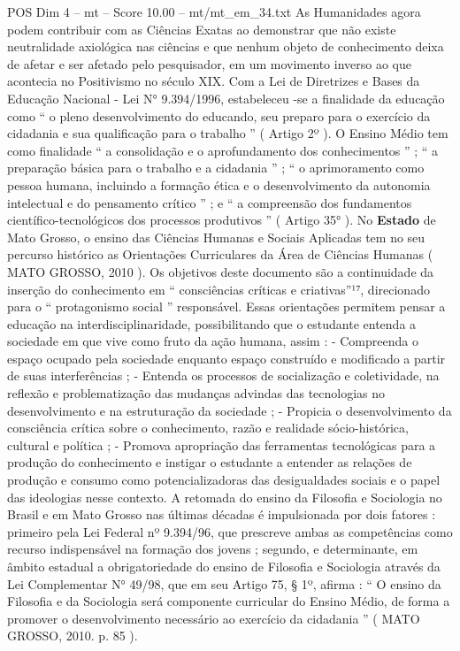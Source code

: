 \begin{textsample}{POS Dim 4 – mt – Score 10.00 – mt/mt\_em\_34.txt}
As Humanidades agora podem contribuir com as Ciências Exatas ao demonstrar que não existe neutralidade axiológica nas ciências e que nenhum objeto de conhecimento deixa de afetar e ser afetado pelo pesquisador, em um movimento inverso ao que acontecia no Positivismo no século XIX.
Com a Lei de Diretrizes e Bases da Educação Nacional - Lei N{\EmojiFont °} 9.394/1996, estabeleceu -se a finalidade da educação como “ o pleno desenvolvimento do educando, seu preparo para o exercício da cidadania e sua qualificação para o trabalho ” ( Artigo 2º ).
O Ensino Médio tem como finalidade “ a consolidação e o aprofundamento dos conhecimentos ” ; “ a preparação básica para o trabalho e a cidadania ” ; “ o aprimoramento como pessoa humana, incluindo a formação ética e o desenvolvimento da autonomia intelectual e do pensamento crítico ” ; e “ a compreensão dos fundamentos científico-tecnológicos dos processos produtivos ” ( Artigo 35{\EmojiFont °} ).
No \textbf{Estado} de Mato Grosso, o ensino das Ciências Humanas e Sociais Aplicadas tem no seu percurso histórico as Orientações Curriculares da Área de Ciências Humanas ( MATO GROSSO, 2010 ).
Os objetivos deste documento são a continuidade da inserção do conhecimento em “ consciências críticas e criativas”¹⁷, direcionado para o “ protagonismo social ” responsável.
Essas orientações permitem pensar a educação na interdisciplinaridade, possibilitando que o estudante entenda a sociedade em que vive como fruto da ação humana, assim : - Compreenda o espaço ocupado pela sociedade enquanto espaço construído e modificado a partir de suas interferências ; - Entenda os processos de socialização e coletividade, na reflexão e problematização das mudanças advindas das tecnologias no desenvolvimento e na estruturação da sociedade ; - Propicia o desenvolvimento da consciência crítica sobre o conhecimento, razão e realidade sócio-histórica, cultural e política ; - Promova apropriação das ferramentas tecnológicas para a produção do conhecimento e instigar o estudante a entender as relações de produção e consumo como potencializadoras das desigualdades sociais e o papel das ideologias nesse contexto.
A retomada do ensino da Filosofia e Sociologia no Brasil e em Mato Grosso nas últimas décadas é impulsionada por dois fatores : primeiro pela Lei Federal nº 9.394/96, que prescreve ambas as competências como recurso indispensável na formação dos jovens ; segundo, e determinante, em âmbito estadual a obrigatoriedade do ensino de Filosofia e Sociologia através da Lei Complementar N{\EmojiFont °} 49/98, que em seu Artigo 75, § 1º, afirma : “ O ensino da Filosofia e da Sociologia será componente curricular do Ensino Médio, de forma a promover o desenvolvimento necessário ao exercício da cidadania ” ( MATO GROSSO, 2010. p. 85 ).

\end{textsample}

